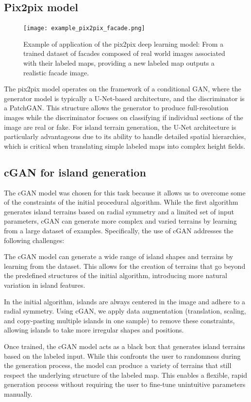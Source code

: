 \subsection{Pix2pix model}

\begin{figure}[H]
	\centering
	\texttt{[image: example\_pix2pix\_facade.png]}
    \caption{Example of application of the pix2pix deep learning model: From a trained dataset of facades composed of real world images associated with their labeled maps, providing a new labeled map outputs a realistic facade image. }
    \label{fig:coral-island-pix2pix-example}
\end{figure}

The pix2pix model operates on the framework of a conditional GAN, where the generator model is typically a U-Net-based architecture, and the discriminator is a PatchGAN. This structure allows the generator to produce full-resolution images while the discriminator focuses on classifying if individual sections of the image are real or fake. For island terrain generation, the U-Net architecture is particularly advantageous due to its ability to handle detailed spatial hierarchies, which is critical when translating simple labeled maps into complex height fields. 


\subsection{cGAN for island generation}

The cGAN model was chosen for this task because it allows us to overcome some of the constraints of the initial procedural algorithm. While the first algorithm generates island terrains based on radial symmetry and a limited set of input parameters, cGAN can generate more complex and varied terrains by learning from a large dataset of examples. Specifically, the use of cGAN addresses the following challenges:
\begin{Itemize}
     The cGAN model can generate a wide range of island shapes and terrains by learning from the dataset. This allows for the creation of terrains that go beyond the predefined structures of the initial algorithm, introducing more natural variation in island features.

     In the initial algorithm, islands are always centered in the image and adhere to a radial symmetry. Using cGAN, we apply data augmentation (translation, scaling, and copy-pasting multiple islands in one sample) to remove these constraints, allowing islands to take more irregular shapes and positions.

     Once trained, the cGAN model acts as a black box that generates island terrains based on the labeled input. While this confronts the user to randomness during the generation process, the model can produce a variety of terrains that still respect the underlying structure of the labeled map. This enables a flexible, rapid generation process without requiring the user to fine-tune unintuitive parameters manually.
\end{Itemize}


